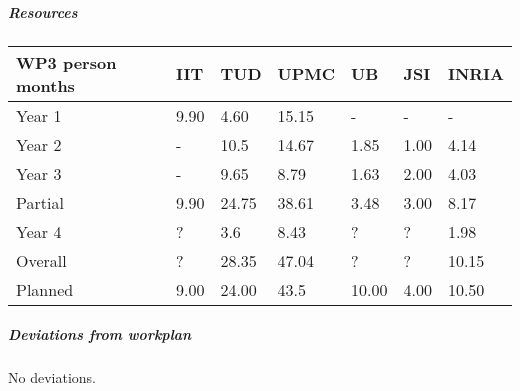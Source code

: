 
\subparagraph{Resources}

\begin{center}
\begin{tabular}{|C{1.5cm}|C{1.5cm}|C{1.5cm}|C{2cm}|C{2cm}|C{2cm}|C{2cm}|}
\hline
\footnotesize \textbf{WP3 person months} & \footnotesize \textbf{IIT}&\footnotesize \textbf{TUD}&\footnotesize \textbf{UPMC}& \footnotesize \textbf{UB} &\footnotesize \textbf{JSI} &\footnotesize \textbf{INRIA} \\ \hline
\footnotesize Year 1  &  9.90 & 4.60  & 15.15 & -    & -    &  -   \\  \hline
\footnotesize Year 2  &  -    & 10.5  & 14.67 & 1.85 & 1.00 & 4.14  \\  \hline
\footnotesize Year 3  &  -    & 9.65  & 8.79  & 1.63 & 2.00 & 4.03 \\  \hline
\footnotesize Partial &  9.90 & 24.75 & 38.61 & 3.48 & 3.00 & 8.17 \\  \hline
\footnotesize Year 4  & ?     & 3.6   & 8.43    & ?    & ?    & 1.98    \\   	\hline
\footnotesize Overall & ?     & 28.35    & 47.04    & ?    & ?    & 10.15    \\
\hline \hline
\footnotesize Planned &  9.00 & 24.00 & 43.5 & 10.00 & 4.00 & 10.50 \\ \hline
\end{tabular}
\end{center}


\subparagraph*{Deviations from workplan}

No deviations.

